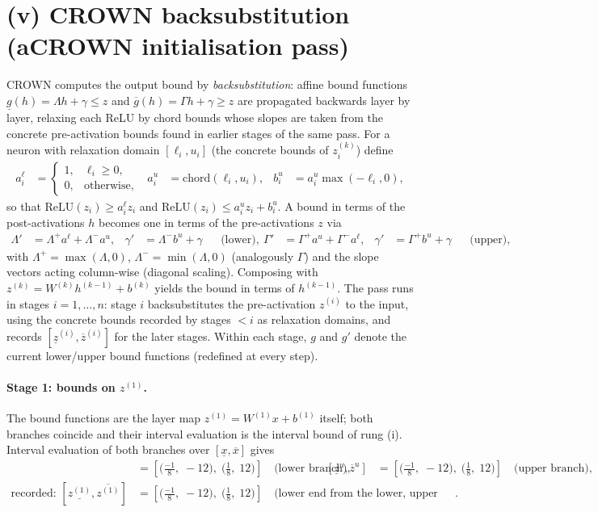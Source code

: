 \documentclass[11pt]{article}
\begin{document}
\section{(v) CROWN backsubstitution (aCROWN initialisation pass)}
CROWN computes the output bound by \emph{backsubstitution}: affine bound functions
$\underline{g}(h) = \Lambda h + \gamma \le z$ and $\overline{g}(h) = \Gamma h + \gamma \ge z$
are propagated backwards layer by layer, relaxing each ReLU by chord bounds whose slopes are taken
from the concrete pre-activation bounds found in earlier stages of the same pass. For a neuron with
relaxation domain $[\ell_i, u_i]$ (the concrete bounds of $z^{(k)}_i$) define
\begin{align*}
a^{\ell}_i &= \begin{cases} 1, & \ell_i \ge 0,\\ 0, & \text{otherwise}, \end{cases} & a^{u}_i &= \mathrm{chord}(\ell_i, u_i), & b^{u}_i &= a^{u}_i \max(-\ell_i, 0),
\end{align*}
so that $\mathrm{ReLU}(z_i) \ge a^{\ell}_i z_i$ and
$\mathrm{ReLU}(z_i) \le a^{u}_i z_i + b^{u}_i$. A bound in terms of the post-activations $h$ becomes
one in terms of the pre-activations $z$ via
\begin{align*}
\Lambda' &= \Lambda^{+} a^{\ell} + \Lambda^{-} a^{u}, & \gamma' &= \Lambda^{-} b^{u} + \gamma && \text{(lower)}, \
\Gamma' &= \Gamma^{+} a^{u} + \Gamma^{-} a^{\ell}, & \gamma' &= \Gamma^{+} b^{u} + \gamma && \text{(upper)},
\end{align*}
with $\Lambda^{+} = \max(\Lambda, 0)$, $\Lambda^{-} = \min(\Lambda, 0)$ (analogously $\Gamma$) and the
slope vectors acting column-wise (diagonal scaling). Composing with
$z^{(k)} = W^{(k)} h^{(k-1)} + b^{(k)}$ yields the bound in terms of $h^{(k-1)}$. The pass runs in
stages $i = 1, \dots, n$: stage $i$ backsubstitutes the pre-activation $z^{(i)}$ to the input, using
the concrete bounds recorded by stages $< i$ as relaxation domains, and records
$[\underline{z}^{(i)}, \overline{z}^{(i)}]$ for the later stages. Within each stage, $g$ and $g'$
denote the current lower/upper bound functions (redefined at every step).
\paragraph{Stage 1: bounds on $z^{(1)}$.}
The bound functions are the layer map $z^{(1)} = W^{(1)} x + b^{(1)}$ itself; both branches coincide and their interval evaluation is the interval bound of rung (i).
Interval evaluation of both branches over $[\underline{x}, \overline{x}]$ gives
\begin{align*}
[\underline{z}^{\ell}, \overline{z}^{\ell}] &= [\bigl(\frac{-1}{8},\; -12\bigr),\; \bigl(\frac{1}{8},\; 12\bigr)] \quad\text{(lower branch)}, & [\underline{z}^{u}, \overline{z}^{u}] &= [\bigl(\frac{-1}{8},\; -12\bigr),\; \bigl(\frac{1}{8},\; 12\bigr)] \quad\text{(upper branch)}, \\
\text{recorded: } [\underline{z^{(1)}}, \overline{z^{(1)}}] &= [\bigl(\frac{-1}{8},\; -12\bigr),\; \bigl(\frac{1}{8},\; 12\bigr)] \quad\text{(lower end from the lower, upper end from the upper branch)}.
\end{align*}
\end{document}
